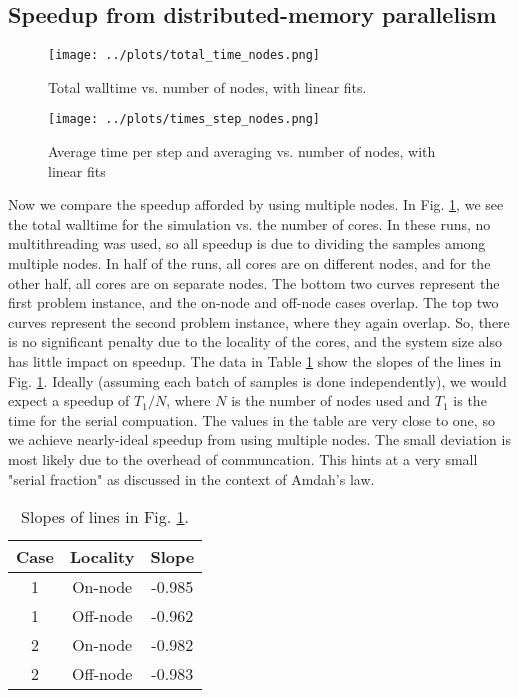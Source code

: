 \documentclass{article}
\begin{document}
\subsection{Speedup from distributed-memory parallelism}

\begin{figure}
    \centering
    \texttt{[image: ../plots/total\_time\_nodes.png]}
    \caption{Total walltime vs. number of nodes, with linear fits.}
    \label{fig:node-total-walltime}
\end{figure}

\begin{figure}
    \centering
    \texttt{[image: ../plots/times\_step\_nodes.png]}
    \caption{Average time per step and averaging vs. number of nodes, with 
    linear fits}
    \label{fig:node-average-step}
\end{figure}

Now we compare the speedup afforded by using multiple nodes. In Fig. \ref{fig:node-total-walltime}, we see the 
total walltime for the simulation vs. the number of cores. In these runs, no multithreading was used, so 
all speedup is due to dividing the samples among multiple nodes. In half of the runs, all cores are on different nodes,
and for the other half, all cores are on separate nodes. The bottom two curves represent the first problem instance,
and the on-node and off-node cases overlap. The top two curves represent the second problem instance, where they 
again overlap.  So, there is no significant penalty due to the locality of the cores, and the system size also 
has little impact on speedup.  The data in Table \ref{tab:node-slopes} show the slopes of the lines in 
Fig. \ref{fig:node-total-walltime}. Ideally (assuming each batch of samples is done independently), 
we would expect a speedup of \(T_1/N\), where \(N\) is the number of nodes used and \(T_1\) is the time
for the serial compuation. The values in the table 
are very close to one, so we achieve nearly-ideal speedup from using multiple nodes. The small deviation 
is most likely due to the overhead of communcation. This hints at a very small "serial fraction" 
as discussed in the context of Amdah's law.

\begin{table}
    \centering
    \begin{tabular}{|c|c|c|}
        \hline
        Case & Locality & Slope \\
        \hline 
        1 & On-node & -0.985 \\
        1 & Off-node & -0.962 \\
        2 & On-node & -0.982 \\
        2 & Off-node & -0.983 \\
        \hline 
    \end{tabular}
    \caption{Slopes of lines in Fig. \ref{fig:node-total-walltime}.}
    \label{tab:node-slopes}
\end{table}
\end{document}
